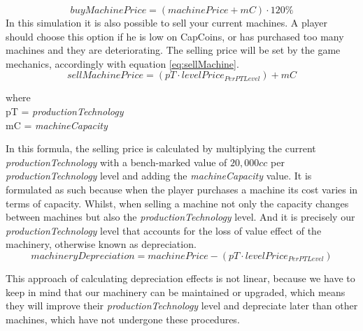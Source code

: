 \begin{equation}
buyMachinePrice=(machinePrice+mC)\cdot 120\%
\label{eq:buyMachine}
\end{equation}
In this simulation it is also possible to sell your current machines. A player should choose this option if he is low on CapCoins, or has purchased too many machines and they are deteriorating. The selling price will be set by the game mechanics, accordingly with equation \ref{eq:sellMachine}.
\begin{equation}
sellMachinePrice=(pT \cdot levelPrice_{PerPTLevel})+mC
\label{eq:sellMachine}
\end{equation}
\begin{center}
	where\\
	pT = \textit{productionTechnology} \\
	mC = \textit{machineCapacity}
\end{center}
In this formula, the selling price is calculated by multiplying the current \textit{productionTechnology} with a bench-marked value of $20,000cc$ per \textit{productionTechnology} level and adding the \textit{machineCapacity} value. It is formulated as such because when the player purchases a machine its cost varies in terms of capacity. Whilst, when selling a machine not only the capacity changes between machines but also the \textit{productionTechnology} level. And it is precisely our \textit{productionTechnology} level that accounts for the loss of value effect of the machinery, otherwise known as depreciation. 
\begin{equation}
machineryDepreciation= machinePrice - (pT \cdot levelPrice_{PerPTLevel})
    \label{eq:machineDepreciation}
\end{equation}

This approach of calculating depreciation effects is not linear, because we have to keep in mind that our machinery can be maintained or upgraded, which means they will improve their \textit{productionTechnology} level and depreciate later than other machines, which have not undergone these procedures.

